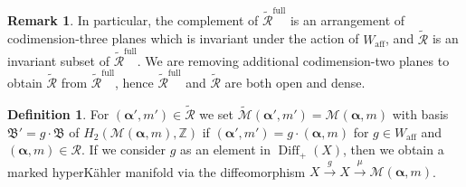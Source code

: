 \documentclass[12pt,letterpaper,reqno]{amsart}
\def\mathbf#1{#1}%
\theoremstyle{remark}
\theoremstyle{definition}
\newtheorem{rem}[thm]{Remark}
\newtheorem{defn}[thm]{Definition}
\numberwithin{thm}{section}
\numberwithin{equation}{section}
\numberwithin{figure}{section}
\newcommand{\Z}{\ensuremath{\mathbb Z}}
\newcommand{\aff}{\mathrm{aff}}
\DeclareMathOperator{\Diff}{Diff}
\begin{document}
\begin{rem}
In particular, the complement of $\widetilde{\mathcal{R}}^{\mathrm{full}}$ is an arrangement of codimension-three planes which is invariant under the action of $W_\aff$, and $\widetilde{\mathcal{R}}$ is an invariant subset of $\widetilde{\mathcal{R}}^{\mathrm{full}}$. We are removing additional codimension-two planes to obtain $\widetilde{\mathcal{R}}$ from $\widetilde{\mathcal{R}}^{\mathrm{full}}$, hence $\widetilde{\mathcal{R}}^{\mathrm{full}}$ and $\widetilde{\mathcal{R}}$ are both open and dense.
\end{rem}

\begin{defn}
For $(\boldsymbol{\alpha}',\mathbf{m}') \in \widetilde{\mathcal{R}}$ we set $\widetilde{\mathcal{M}}(\boldsymbol{\alpha}',\mathbf{m}') = \mathcal{M}(\boldsymbol{\alpha},\mathbf{m})$ with basis $\mathfrak{B}' = g \cdot \mathfrak{B}$ of $H_2(\mathcal{M}(\boldsymbol{\alpha},\mathbf{m}),\Z)$ if $(\boldsymbol{\alpha}',\mathbf{m}') = g \cdot (\boldsymbol{\alpha},\mathbf{m})$ for $g \in W_{\mathrm{aff}}$ and $(\boldsymbol{\alpha},\mathbf{m}) \in\mathcal{R}$. If we consider $g$ as an element in $\Diff_+(X)$, then we obtain a marked hyperK\"ahler manifold via the diffeomorphism $X \overset{g}\rightarrow X \overset{\mu}\rightarrow \mathcal{M}(\boldsymbol{\alpha},\mathbf{m})$.

\end{defn}
\end{document}
